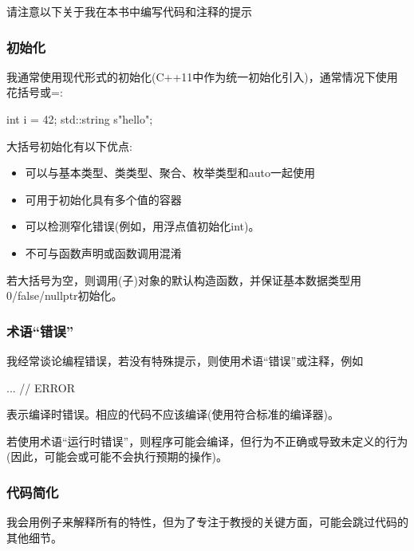 
请注意以下关于我在本书中编写代码和注释的提示

\subsubsection*{ 初始化}

我通常使用现代形式的初始化(C++11中作为统一初始化引入)，通常情况下使用花括号或=:

\begin{cpp}
int i = 42;
std::string s{"hello"};
\end{cpp}

大括号初始化有以下优点:

\begin{itemize}
\item
可以与基本类型、类类型、聚合、枚举类型和auto一起使用

\item
可用于初始化具有多个值的容器

\item
可以检测窄化错误(例如，用浮点值初始化int)。

\item
不可与函数声明或函数调用混淆
\end{itemize}

若大括号为空，则调用(子)对象的默认构造函数，并保证基本数据类型用0/false/nullptr初始化。


\subsubsection*{ 术语“错误”}

我经常谈论编程错误，若没有特殊提示，则使用术语“错误”或注释，例如

\begin{cpp}
... // ERROR
\end{cpp}

表示编译时错误。相应的代码不应该编译(使用符合标准的编译器)。

若使用术语“运行时错误”，则程序可能会编译，但行为不正确或导致未定义的行为(因此，可能会或可能不会执行预期的操作)。

\subsubsection*{ 代码简化}

我会用例子来解释所有的特性，但为了专注于教授的关键方面，可能会跳过代码的其他细节。

